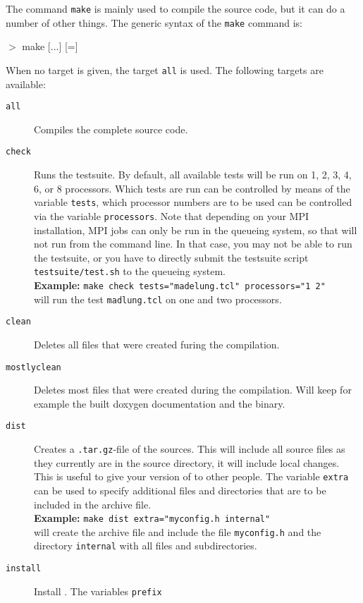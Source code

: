 The command \texttt{make} is mainly used to compile the \es{} source
code, but it can do a number of other things. The generic syntax of
the \texttt{make} command is:
\begin{syntax}
 $>$ make [...] [=]
\end{syntax}
When no target is given, the target \texttt{all} is used. The
following targets are available:
\begin{description}
\item[\texttt{all}] Compiles the complete \es{} source code.
\item[\texttt{check}] Runs the testsuite. By default, all available
  tests will be run on 1, 2, 3, 4, 6, or 8 processors. Which tests are
  run can be controlled by means of the variable \texttt{tests}, which
  processor numbers are to be used can be controlled via the variable
  \texttt{processors}. Note that depending on your MPI installation,
  MPI jobs can only be run in the queueing system, so that \es{} will
  not run from the command line. In that case, you may not be able to
  run the testsuite, or you have to directly submit the testsuite script
  \verb!testsuite/test.sh! to the queueing system.\\
  \textbf{Example:} \verb!make check tests="madelung.tcl" processors="1 2"!\\
  will run the test \texttt{madlung.tcl} on one and two processors.
\item[\texttt{clean}] Deletes all files that were created furing the
  compilation.
\item[\texttt{mostlyclean}] Deletes most files that were created
  during the compilation. Will keep for example the built doxygen
  documentation and the \es{} binary.
\item[\texttt{dist}] Creates a \texttt{.tar.gz}-file of the \es{}
  sources.  This will include all source files as they currently are
  in the source directory, \ie{} it will include local changes.  This
  is useful to give your version of \es{} to other people.
  The variable \texttt{extra} can be used to specify additional
  files and directories that are to be included in the archive
  file. \\
  \textbf{Example:} \verb!make dist extra="myconfig.h internal"!\\
  will create the archive file and include the file
  \texttt{myconfig.h} and the directory \texttt{internal} with all
  files and subdirectories.
\item[\texttt{install}] Install \es{}. The variables \texttt{prefix}

\end{description}
